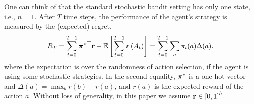 One can think of that the standard stochastic bandit setting has only one state, i.e., $n=1$.  
After $T$ time steps, the performance of the agent's strategy is measured by the (expected) regret,
\begin{equation}
\label{eq:expected_regret}
R_T = \sum\limits_{t=0}^{T-1}{{{\boldsymbol{\pi}}^*}^\top {\mathbf{r}}} - {\mathbb{E}} \left[ \sum\limits_{t=0}^{T-1}{  r\left(A_t\right)  } \right] = \sum_{t=0}^{T-1} \sum_a \pi_t(a) \Delta(a).
\end{equation}
where the expectation is over the randomness of action selection, if the agent is using some stochastic strategies. In the second equality, ${\boldsymbol{\pi}}^*$ is a one-hot vector and $\Delta(a) = \max_b r(b)- r(a)$, and  $r(a)$ is the expected reward of the action $a$.
Without loss of generality, in this paper we assume ${\mathbf{r}} \in \left[ 0, 1 \right]^h$.


